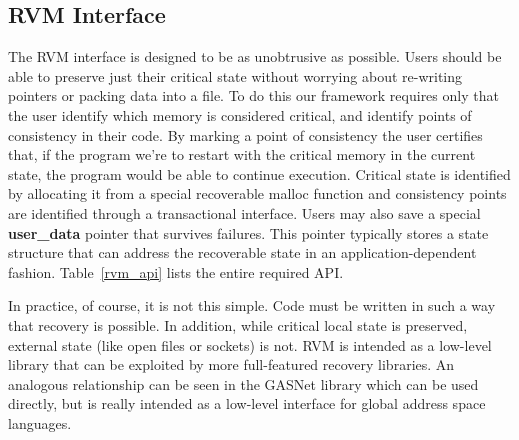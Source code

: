 \subsection{RVM Interface}
The RVM interface is designed to be as unobtrusive as possible. Users should be
able to preserve just their critical state without worrying about re-writing
pointers or packing data into a file. To do this our framework requires only
that the user identify which memory is considered critical, and identify points
of consistency in their code. By marking a point of consistency the user
certifies that, if the program we're to restart with the critical memory in the
current state, the program would be able to continue execution. Critical state
is identified by allocating it from a special recoverable malloc function and
consistency points are identified through a transactional interface. Users may
also save a special {\bf user\_data} pointer that survives failures. This pointer
typically stores a state structure that can address the recoverable state in an
application-dependent fashion. Table~\ref{rvm_api} lists the entire required API.

\begin{table}[t!]
\centering
\caption{RVM API}
\label{tab:rvm_api}
\end{table}

In practice, of course, it is not this simple. Code must be written in such a
way that recovery is possible. In addition, while critical local state is
preserved, external state (like open files or sockets) is not. RVM is intended
as a low-level library that can be exploited by more full-featured recovery
libraries. An analogous relationship can be seen in the GASNet \cite{GASNET}
library which can be used directly, but is really intended as a low-level
interface for global address space languages.
